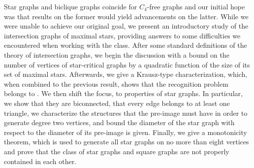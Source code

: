 Star graphs and biclique graphs coincide for $C_4$-free graphs and our initial hope was that results on the former would yield advancements on the latter.
While we were unable to achieve our original goal, we present an introductory study of the intersection graphs of maximal stars, providing answers to some difficulties we encountered when working with the class.
After some standard definitions of the theory of intersection graphs, we begin the discussion with a bound on the number of vertices of star-critical graphs by a quadratic function of the size of its set of maximal stars.
Afterwards, we give a Krausz-type characterization, which, when combined to the previous result, shows that the recognition problem belongs to \NP.
We then shift the focus, to properties of star graphs.
In particular, we show that they are biconnected, that every edge belongs to at least one triangle, we characterize the structures that the pre-image must have in order to generate degree two vertices, and bound the diameter of the star graph with respect to the diameter of its pre-image is given.
Finally, we give a monotonicity theorem, which is used to generate all star graphs on no more than eight vertices and prove that the class of star graphs and square graphs are not properly contained in each other.






